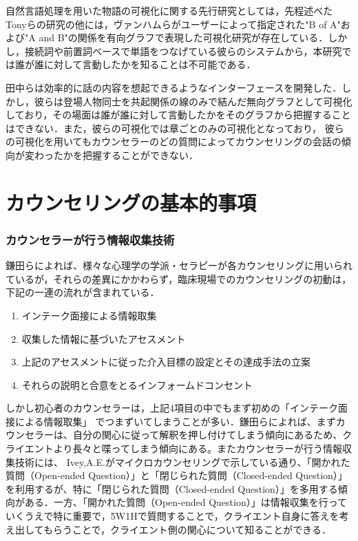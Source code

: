 \documentclass[shuuron]{kuee}
\begin{document}
自然言語処理を用いた物語の可視化に関する先行研究としては，先程述べたTonyら\cite{bergstrom2007seeing}の研究の他には，ヴァンハムら\cite{van2009mapping}がユーザーによって指定された"B of A"および"A and B"の関係を有向グラフで表現した可視化研究が存在している．しかし，接続詞や前置詞ベースで単語をつなげている彼らのシステムから，本研究では誰が誰に対して言動したかを知ることは不可能である．

田中ら\cite{tanaka}は効率的に話の内容を想起できるようなインターフェースを開発した．しかし，彼らは登場人物同士を共起関係の線のみで結んだ無向グラフとして可視化しており，その場面は誰が誰に対して言動したかをそのグラフから把握することはできない．また，彼らの可視化では章ごとのみの可視化となっており， 彼らの可視化を用いてもカウンセラーのどの質問によってカウンセリングの会話の傾向が変わったかを把握することができない．



\section{カウンセリングの基本的事項}

\subsubsection{カウンセラーが行う情報収集技術}

鎌田ら\cite{Darshana}によれば、様々な心理学の学派・セラピーが各カウンセリングに用いられているが，それらの差異にかかわらず，臨床現場でのカウンセリングの初動は，下記の一連の流れが含まれている．

\begin{enumerate}
  \item インテーク面接による情報取集
  \item 収集した情報に基づいたアセスメント
  \item 上記のアセスメントに従った介入目標の設定とその達成手法の立案
  \item それらの説明と合意をとるインフォームドコンセント
\end{enumerate}
しかし初心者のカウンセラーは，上記4項目の中でもまず初めの「インテーク面接による情報取集」
でつまずいてしまうことが多い．鎌田らによれば、まずカウンセラーは、自分の関心に従って解釈を押し付けてしまう傾向にあるため、クライエントより長々と喋ってしまう傾向にある。またカウンセラーが行う情報収集技術には、
Ivey,A.E.\cite{ivey}がマイクロカウンセリングで示している通り、「開かれた質問（Open-ended Question）」と「閉じられた質問（Closed-ended Question）」を利用するが、特に「閉じられた質問（Closed-ended Question）」を多用する傾向がある．一方、「開かれた質問（Open-ended Question）」は情報収集を行っていくうえで特に重要で，5W1Hで質問することで，クライエント自身に答えを考え出してもらうことで，クライエント側の関心について知ることができる．
\end{document}
